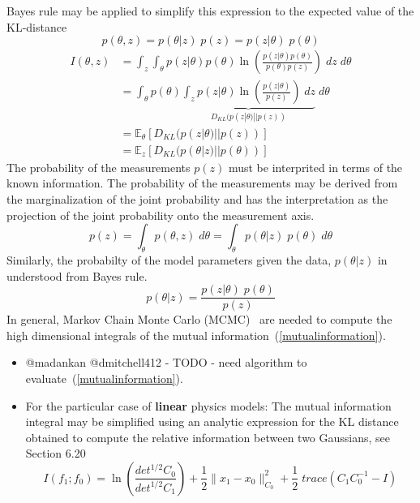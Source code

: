 \documentclass[10pt]{amsart}
\newcommand{\eqn}[1]{(\ref{#1})}
\begin{document}
\begin{enumerate}
Bayes rule may be applied to simplify this expression
to the expected value of the KL-distance
\[
p(\theta,z) = p(\theta|z) \; p(z)
            = p(z|\theta) \; p(\theta)
\]
\begin{equation}
\label{mutualinformation}
\begin{split}
I(\theta,z) &= \int_z \int_\theta p(z|\theta) p(\theta) \ln\left(\frac{p(z|\theta)p(\theta)}{p(\theta)p(z)}\right)  \; dz\; d\theta
\\
            &= \int_\theta p(\theta) \underbrace{\int_z  p(z|\theta) \ln\left(\frac{p(z|\theta)}{p(z)}\right)  \; dz}_{D_{KL}(p(z|\theta)||p(z) )} \; d\theta
\\
            &= \mathbb{E}_\theta\left[D_{KL}(p(z|\theta)||p(z) )\right]
\\
            &= \mathbb{E}_z     \left[D_{KL}(p(\theta|z)||p(\theta) )\right]
\end{split}
\end{equation}
The probability of the measurements $p(z)$ must be interprited in terms of the
known information. The probability of the measurements may be derived from
the marginalization of the joint probability and has the interpretation as
the projection of the joint probability onto the measurement axis.
\[
  p(z) = \int_\theta p(\theta,z)  \; d\theta 
       = \int_\theta p(\theta|z) \; p(\theta)\; d\theta 
\]
Similarly, the probabilty of the model parameters given the data,
$p(\theta|z)$ in understood from Bayes rule.
\[
       p(\theta|z) = \frac{ p(z|\theta) \; p(\theta)} {p(z)}
\]
In general, Markov Chain Monte Carlo (MCMC)~\cite{Murphy2012a} are needed to compute
the high dimensional integrals of the mutual information~\eqn{mutualinformation}.
\begin{itemize} 
\item {\color{red}  @madankan @dmitchell412 - TODO - need algorithm to evaluate~\eqn{mutualinformation}.
}
\end{itemize} 
\begin{itemize} 
\item For the particular case of \textbf{linear} physics models:
The mutual information integral may be simplified using an analytic expression for the KL
distance obtained to compute the relative information between two Gaussians,
see
\cite{tarantola05} Section 6.20
\begin{equation} \label{TwoGaussMI}
I(f_1;f_0) = \ln \left(\frac{det^{1/2} C_0}{det^{1/2} C_1}\right) + \frac{1}{2}\|x_1 - x_0\|^2_{C_0} + \frac{1}{2} \; trace( C_1 C_0^{-1} -I) 
\end{equation}

\end{itemize}
\end{enumerate}
\end{document}

